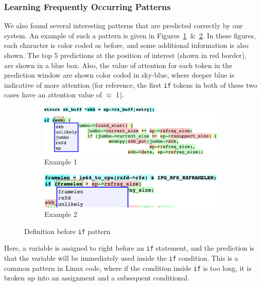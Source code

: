 \subsubsection{Learning Frequently Occurring Patterns}
We also found several interesting patterns that are predicted correctly by our
system. An example of such a pattern is given in
Figures~\ref{fig:conditional1}~\&~\ref{fig:conditional2}. In these figures, each
character is color coded as before, and some additional information is also
shown. The top 5 predictions at the position of interest (shown in red border),
are shown in a blue box. Also, the value of attention for each token in the
prediction window are shown color coded in sky-blue, where deeper blue is
indicative of more attention (for reference, the first {\tt if} tokens in both
of these two cases have an attention value of $\approx$ 1).

\begin{figure}
  \centering
\begin{subfigure}{\linewidth}
  \includegraphics[width=\linewidth]{figs/example8.png}
  \caption{Example 1}
  \label{fig:conditional1}
\end{subfigure}
\begin{subfigure}{\linewidth}
  \includegraphics[width=\linewidth]{figs/example9.png}
  \caption{Example 2}
  \label{fig:conditional2}
\end{subfigure}
  \caption{Definition before {\tt if} pattern}
  \label{fig:ifpattern}
\end{figure}

Here, a variable is assigned to right before an {\tt if} statement, and the
prediction is that the variable will be immediately used inside the {\tt if}
condition. This is a common pattern in Linux code, where if the condition inside
{\tt if} is too long, it is broken up into an assignment and a subsequent
conditional.

